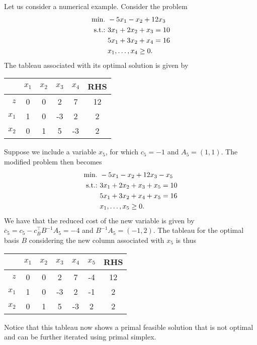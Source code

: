 Let us consider a numerical example. Consider the problem
%
\begin{align*}
	\mathop{\text{min.~}} & -5x_1 -x_2 + 12 x_3 \\
	\mathop{\text{s.t.:~}}   & 3x_1 + 2x_2 + x_3 = 10 \\
	& 5x_1 + 3x_2 + x_4 = 16 \\
	& x_1, \dots, x_4 \geq 0.
\end{align*}
%
The tableau associated with its optimal solution is given by

\begin{center}
	\begin{tabular}{r|cccc|c} 
	   &$x_1$ & $x_2$ & $x_3$ & $x_4$& RHS \\ \hline	
	   $z$ & 0 & 0 & 2 & 7 & 12\\ \hline
	   $x_1$ & 1 & 0 & -3 & 2 & 2\\
	   $x_2$ & 0 & 1 & 5 & -3 & 2            
	\end{tabular}
\end{center}

Suppose we include a variable $x_5$, for which $c_5 = -1$ and $A_5 = (1,1)$. The modified problem then becomes
%
\begin{align*}
	\mathop{\text{min.~}} & -5x_1 -x_2 + 12 x_3 -x_5 	 \\
	\mathop{\text{s.t.:~}}   & 3x_1 + 2x_2 + x_3 + x_5 = 10 \\
	& 5x_1 + 3x_2 + x_4 + x_5 = 16 \\
	& x_1, \dots, x_5 \geq 0.
\end{align*}
%
We have that the reduced cost of the new variable is given by $\overline{c}_5 = c_5 - c_B^\top B^{-1}A_5 = -4$ and $B^{-1}A_5 = (-1,2)$. The tableau for the optimal basis $B$ considering the new column associated with $x_5$ is thus

\begin{center}
	\begin{tabular}{r|ccccc|c} 
	   &$x_1$ & $x_2$ & $x_3$ & $x_4$& $x_5$ & RHS \\ \hline	
	   $z$ & 0 & 0 & 2 & 7 & -4 & 12   \\ \hline
	   $x_1$ & 1 & 0 & -3 & 2 & -1 & 2 \\
	   $x_2$ & 0 & 1 & 5 & -3 & 2 & 2	            
	\end{tabular}
\end{center}

Notice that this tableau now shows a primal feasible solution that is not optimal and can be further iterated using primal simplex.



